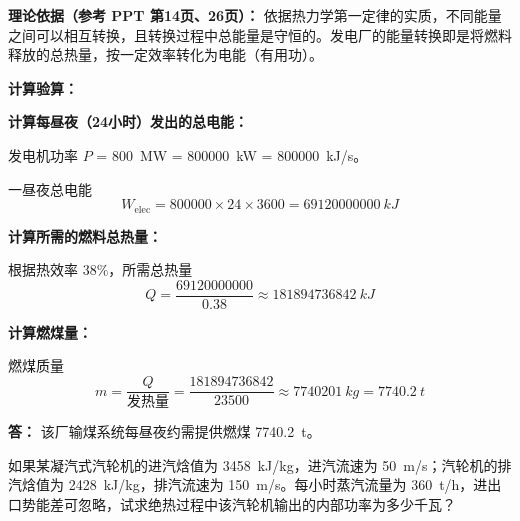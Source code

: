 \begin{solution}
\textbf{理论依据（参考 PPT 第14页、26页）：} 依据热力学第一定律的实质，不同能量之间可以相互转换，且转换过程中总能量是守恒的。发电厂的能量转换即是将燃料释放的总热量，按一定效率转化为电能（有用功）。

\textbf{计算验算：}

\textbf{计算每昼夜（24小时）发出的总电能：}

发电机功率 \(P\) = \qty{800}{MW} = \qty{800000}{kW} = \qty{800000}{kJ/s}。

一昼夜总电能
\begin{equation*}
  W_{\text{elec}} = 800000 \times 24 \times 3600 = \qty{69120000000}{kJ}
\end{equation*}

\textbf{计算所需的燃料总热量：}

根据热效率 \(38\%\)，所需总热量
\begin{equation*}
  Q = \frac{69120000000}{0.38} \approx \qty{181894736842}{kJ}
\end{equation*}

\textbf{计算燃煤量：}

燃煤质量
\begin{equation*}
  m = \frac{Q}{\text{发热量}} = \frac{181894736842}{23500} \approx \qty{7740201}{kg} = \qty{7740.2}{t}
\end{equation*}

\textbf{答：} 该厂输煤系统每昼夜约需提供燃煤 \qty{7740.2}{t}。
\end{solution}

\begin{problem}[汽轮机内部功率计算]
如果某凝汽式汽轮机的进汽焓值为 \qty{3458}{kJ/kg}，进汽流速为 \qty{50}{m/s}；汽轮机的排汽焓值为 \qty{2428}{kJ/kg}，排汽流速为 \qty{150}{m/s}。每小时蒸汽流量为 \qty{360}{t/h}，进出口势能差可忽略，试求绝热过程中该汽轮机输出的内部功率为多少千瓦？
\end{problem}

